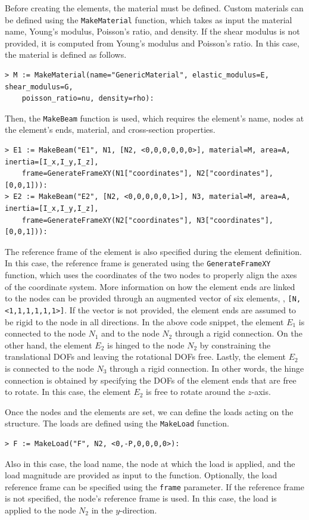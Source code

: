 Before creating the elements, the material must be defined. Custom materials can be defined using the \texttt{MakeMaterial} function, which takes as input the material name, Young's modulus, Poisson's ratio, and density. If the shear modulus is not provided, it is computed from Young's modulus and Poisson's ratio. In this case, the material is defined as follows.
%
\begin{verbatim}
> M := MakeMaterial(name="GenericMaterial", elastic_modulus=E, shear_modulus=G,
    poisson_ratio=nu, density=rho):
\end{verbatim}
%
Then, the \texttt{MakeBeam} function is used, which requires the element's name, nodes at the element's ends, material, and cross-section properties.
%
\begin{verbatim}
> E1 := MakeBeam("E1", N1, [N2, <0,0,0,0,0,0>], material=M, area=A, inertia=[I_x,I_y,I_z],
    frame=GenerateFrameXY(N1["coordinates"], N2["coordinates"], [0,0,1])):
> E2 := MakeBeam("E2", [N2, <0,0,0,0,0,1>], N3, material=M, area=A, inertia=[I_x,I_y,I_z],
    frame=GenerateFrameXY(N2["coordinates"], N3["coordinates"], [0,0,1])):
\end{verbatim}
%
The reference frame of the element is also specified during the element definition. In this case, the reference frame is generated using the \texttt{GenerateFrameXY} function, which uses the coordinates of the two nodes to properly align the axes of the coordinate system. More information on how the element ends are linked to the nodes can be provided through an augmented vector of six elements, \eg{}, \texttt{[N, <1,1,1,1,1,1>]}. If the vector is not provided, the element ends are assumed to be rigid to the node in all directions. In the above code snippet, the element $E_1$ is connected to the node $N_1$ and to the node $N_2$ through a rigid connection. On the other hand, the element $E_2$ is hinged to the node $N_2$ by constraining the translational \acp{DOF} and leaving the rotational \acp{DOF} free. Lastly, the element $E_2$ is connected to the node $N_3$ through a rigid connection. In other words, the hinge connection is obtained by specifying the \acp{DOF} of the element ends that are free to rotate. In this case, the element $E_2$ is free to rotate around the $z$-axis.

Once the nodes and the elements are set, we can define the loads acting on the structure. The loads are defined using the \texttt{MakeLoad} function.
%
\begin{verbatim}
> F := MakeLoad("F", N2, <0,-P,0,0,0,0>):
\end{verbatim}
%
Also in this case, the load name, the node at which the load is applied, and the load magnitude are provided as input to the function. Optionally, the load reference frame can be specified using the \texttt{frame} parameter. If the reference frame is not specified, the node's reference frame is used. In this case, the load is applied to the node $N_2$ in the $y$-direction.

